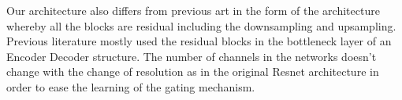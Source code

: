 Our architecture also differs from previous art in the form of the architecture whereby all the blocks are residual including the downsampling and upsampling. Previous literature mostly used the residual blocks in the bottleneck layer of an Encoder Decoder structure. The number of channels in the networks doesn't change with the change of resolution as in the original Resnet architecture \cite{he2016deep} in order to ease the learning of the gating mechanism. 



